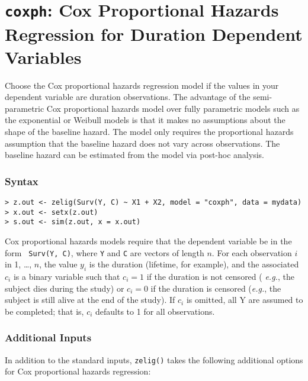 \section{\texttt{coxph}: Cox Proportional Hazards Regression for Duration Dependent Variables}
\label{coxph}

Choose the Cox proportional hazards regression model if the values in your dependent
variable are duration observations.  The advantage of the semi-parametric Cox proportional hazards model over fully parametric models such as the exponential or Weibull models is that it makes no assumptions about the shape of the baseline hazard.  The model only requires the proportional hazards assumption that the baseline hazard does not vary across observations.  The baseline hazard can be estimated from the model via post-hoc analysis.

\subsubsection{Syntax}

\begin{verbatim}
> z.out <- zelig(Surv(Y, C) ~ X1 + X2, model = "coxph", data = mydata)
> x.out <- setx(z.out)
> s.out <- sim(z.out, x = x.out)
\end{verbatim}
Cox proportional hazards models require that the dependent variable be in the form {\tt
  Surv(Y, C)}, where {\tt Y} and {\tt C} are vectors of length $n$.
For each observation $i$ in 1, \dots, $n$, the value $y_i$ is the
duration (lifetime, for example), and the associated $c_i$ is a binary
variable such that $c_i = 1$ if the duration is not censored ({\it
  e.g.}, the subject dies during the study) or $c_i = 0$ if the
duration is censored ({\it e.g.}, the subject is still alive at the
end of the study).  If $c_i$ is omitted, all Y are assumed to be
completed; that is, $c_i$ defaults to 1 for all observations.


\subsubsection{Additional Inputs}

In addition to the standard inputs, {\tt zelig()} takes the following additional options for Cox proportional hazards regression:

